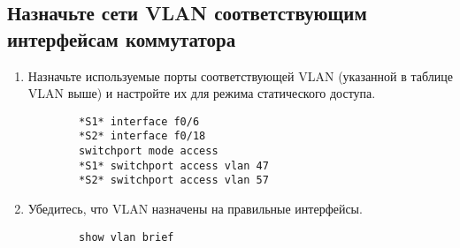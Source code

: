 \subsection{Назначьте сети VLAN соответствующим интерфейсам коммутатора}
\begin{enumerate}[a]
    \item Назначьте используемые порты соответствующей VLAN (указанной в таблице VLAN выше) и
    настройте их для режима статического доступа.
    \begin{verbatim}
        *S1* interface f0/6
        *S2* interface f0/18
        switchport mode access
        *S1* switchport access vlan 47
        *S2* switchport access vlan 57
    \end{verbatim}

    \item Убедитесь, что VLAN назначены на правильные интерфейсы.
    \begin{verbatim}
        show vlan brief
    \end{verbatim}
\end{enumerate}

